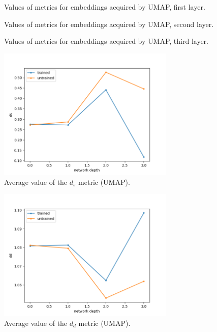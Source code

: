 \documentclass{article}
\begin{document}
\begin{figure}
  \centering
    \resizebox{\textwidth}{!}{
        
    }
    \caption{Values of metrics for embeddings acquired by UMAP, first layer.}
\end{figure}

\begin{figure}
  \centering
    \resizebox{\textwidth}{!}{
        
    }
    \caption{Values of metrics for embeddings acquired by UMAP, second layer.}
\end{figure}

\begin{figure}
  \centering
    \resizebox{\textwidth}{!}{
        
    }
    \caption{Values of metrics for embeddings acquired by UMAP, third layer.}
\end{figure}

\begin{figure}
  \centering
    \includegraphics[width=0.75\textwidth]{../../out/activations_cnn/mnist/umap/plot_metric_ds.png}
    \caption{Average value of the \(d_s\) metric (UMAP).}
\end{figure}

\begin{figure}
  \centering
    \includegraphics[width=0.75\textwidth]{../../out/activations_cnn/mnist/umap/plot_metric_dd.png}
    \caption{Average value of the \(d_d\) metric (UMAP).}
\end{figure}
\end{document}
